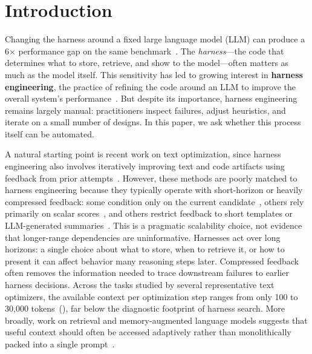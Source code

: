 \documentclass{article}
\begin{document}
\section{Introduction}
\label{sec:introduction}

Changing the harness around a fixed large language model (LLM) can produce a 6$\times$ performance gap on the same benchmark~\citep{Tian2026SWEBenchMC}.
The \textit{harness}---the code that determines what to store, retrieve, and show to the model---often matters as much as the model itself.
This sensitivity has led to growing interest in \textbf{harness engineering}, the practice of refining the code around an LLM to improve the overall system's performance~\citep {openai2026harnessengineering,young2025harness,boluk2026harnessproblem,bockeler2026harnessengineering}.
But despite its importance, harness engineering remains largely manual: practitioners inspect failures, adjust heuristics, and iterate on a small number of designs.
In this paper, we ask whether this process itself can be automated.

A natural starting point is recent work on text optimization, since harness engineering also involves iteratively improving text and code artifacts using feedback from prior attempts~\citep{pryzant2023protegi,romera2024mathematical,novikov2025alphaevolve,lee2025feedback,agrawal2025gepa}.
However, these methods are poorly matched to harness engineering because they typically operate with short-horizon or heavily compressed feedback: some condition only on the current candidate~\citep{madaan2023self,yang2023large,yuksekgonul2024textgradautomaticdifferentiationtext}, others rely primarily on scalar scores~\citep{novikov2025alphaevolve,cemri2026adaevolve}, and others restrict feedback to short templates or LLM-generated summaries~\citep{agrawal2025gepa,lee2025feedback}.
This is a pragmatic scalability choice, not evidence that longer-range dependencies are uninformative.
Harnesses act over long horizons: a single choice about what to store, when to retrieve it, or how to present it can affect behavior many reasoning steps later.
Compressed feedback often removes the information needed to trace downstream failures to earlier harness decisions.
Across the tasks studied by several representative text optimizers, the available context per optimization step ranges from only 100 to 30{,}000 tokens~(), far below the diagnostic footprint of harness search.
More broadly, work on retrieval and memory-augmented language models suggests that useful context should often be accessed adaptively rather than monolithically packed into a single prompt~\citep{lewis2020retrieval,trivedi2023interleavingretrievalchainofthoughtreasoning,packer2023memgpt,zhang2026recursivelanguagemodels}.
\end{document}
